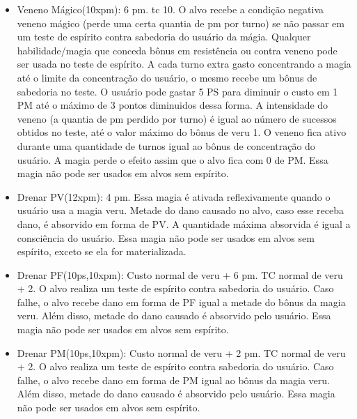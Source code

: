\begin{itemize}
	\item Veneno Mágico(10xpm): 6 pm. tc 10.\newline
O alvo recebe a condição negativa veneno mágico (perde uma certa quantia de pm por turno) se não passar em um teste de espírito contra sabedoria do usuário da mágia. Qualquer habilidade/magia que conceda bônus em resistência ou contra veneno pode ser usada no teste de espírito. A cada turno extra gasto concentrando a magia até o limite da concentração do usuário, o mesmo recebe um bônus de sabedoria no teste. O usuário pode gastar 5 PS para diminuir o custo em 1 PM até o máximo de 3 pontos diminuidos dessa forma. A intensidade do veneno (a quantia de pm perdido por turno) é igual ao número de sucessos obtidos no teste, até o valor máximo do bônus de veru 1. O veneno fica ativo durante uma quantidade de turnos igual ao bônus de concentração do usuário. A magia perde o efeito assim que o alvo fica com 0 de PM. Essa magia não pode ser usados em alvos sem espírito.



	\item Drenar PV(12xpm): 4 pm.\newline
Essa magia é ativada reflexivamente quando o usuário usa a magia veru. Metade do dano causado no alvo, caso esse receba dano, é absorvido em forma de PV. A quantidade máxima absorvida é igual a consciência do usuário. Essa magia não pode ser usados em alvos sem espírito, exceto se ela for materializada.
	
	\item Drenar PF(10ps,10xpm): Custo normal de veru + 6 pm. TC normal de veru + 2.\newline
O alvo realiza um teste de espírito contra sabedoria do usuário. Caso falhe, o alvo recebe dano em forma de PF igual a metade do bônus da magia veru. Além disso, metade do dano causado é absorvido pelo usuário. Essa magia não pode ser usados em alvos sem espírito.

	\item Drenar PM(10ps,10xpm): Custo normal de veru + 2 pm. TC normal de veru + 2.\newline
O alvo realiza um teste de espírito contra sabedoria do usuário. Caso falhe, o alvo recebe dano em forma de PM igual ao bônus da magia veru. Além disso, metade do dano causado é absorvido pelo usuário. Essa magia não pode ser usados em alvos sem espírito. 


\end{itemize}
